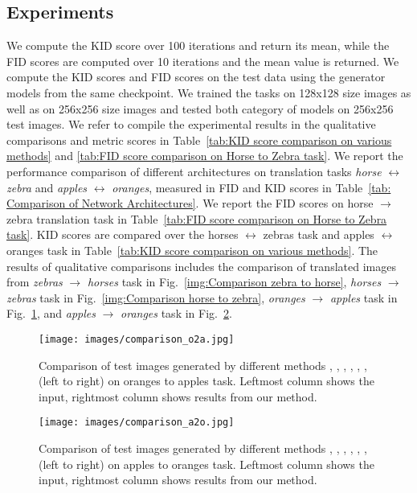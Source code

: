 \documentclass[a4paper,twoside]{article}
\begin{document}
\subsection{Experiments}
\noindent
We compute the KID score over 100 iterations and return its mean, while the FID scores are computed over 10 iterations and the mean value is returned. We compute the KID scores and FID scores on the test data using the generator models from the same checkpoint. We trained the tasks on 128x128 size images as well as on 256x256 size images and tested both category of models on 256x256 test images. We refer \cite{attentionGAN} to compile the experimental results in the qualitative comparisons and metric scores in Table~\ref{tab:KID score comparison on various methods} and \ref{tab:FID score comparison on Horse to Zebra task}. We report the performance comparison of different architectures on translation tasks \textit{horse} $\leftrightarrow$ \textit{zebra} and \textit{apples} $\leftrightarrow$ \textit{oranges}, measured in FID and KID scores in Table~\ref{tab: Comparison of Network Architectures}. We report the FID scores on horse $\rightarrow$ zebra translation task in Table~\ref{tab:FID score comparison on Horse to Zebra task}. KID scores are compared over the horses $\leftrightarrow$ zebras task and apples $\leftrightarrow$ oranges task in Table~\ref{tab:KID score comparison on various methods}. The results of qualitative comparisons includes the comparison of translated images from \textit{zebras} $\rightarrow$ \textit{horses} task in Fig.~\ref{img:Comparison zebra to horse}, \textit{horses} $\rightarrow$ \textit{zebras} task in Fig.~\ref{img:Comparison horse to zebra},
\textit{oranges} $\rightarrow$ \textit{apples} task in Fig.~\ref{img:Comparison oranges to apples}, and \textit{apples} $\rightarrow$ \textit{oranges} task in Fig.~\ref{img:Comparison apples to oranges}.
\begin{figure}[!ht] \small
\centering
\texttt{[image: images/comparison\_o2a.jpg]}
\caption{Comparison of test images generated by different methods \cite{CycleGAN2017}, \cite{Residual-Attention_WangJQYLZWT17}, \cite{DiscoGAN_KimCKLK17}, \cite{UNIT_LiuBK17}, \cite{DualGAN_YiZTG17}, \cite{Mejjati2018UAIT}, \cite{attentionGAN} (left to right) on oranges to apples task. Leftmost column shows the input, rightmost column shows results from our method.
}
\label{img:Comparison oranges to apples}
\end{figure}
\begin{figure}[!ht] \small
\centering
\texttt{[image: images/comparison\_a2o.jpg]}
\caption{Comparison of test images generated by different methods \cite{CycleGAN2017}, \cite{Residual-Attention_WangJQYLZWT17}, \cite{DiscoGAN_KimCKLK17}, \cite{UNIT_LiuBK17}, \cite{DualGAN_YiZTG17}, \cite{Mejjati2018UAIT}, \cite{attentionGAN} (left to right) on apples to oranges task. Leftmost column shows the input, rightmost column shows results from our method.
}
\label{img:Comparison apples to oranges}
\end{figure}
\end{document}
